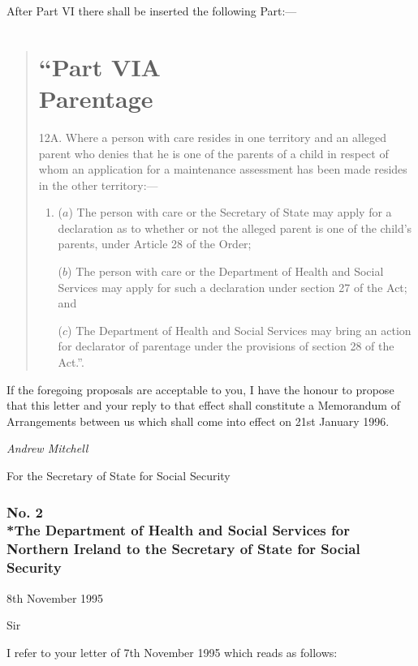 \documentclass[a4paper]{article}
\begin{document}
  After Part VI there shall be inserted the following Part:—
\begin{quotation}
 \part*{“Part VIA\\Parentage}

12A.  Where a person with care resides in one territory and an alleged parent who denies that he is one of the parents of a child in respect of whom an application for a maintenance assessment has been made resides in the other territory:—
\begin{enumerate}\item[]
($a$) The person with care or the Secretary of State may apply for a declaration as to whether or not the alleged parent is one of the child’s parents, under Article 28 of the Order;

($b$) The person with care or the Department of Health and Social Services may apply for such a declaration under section 27 of the Act; and

($c$) The Department of Health and Social Services may bring an action for declarator of parentage under the provisions of section 28 of the Act.”.
\end{enumerate}
\end{quotation}

  If the foregoing proposals are acceptable to you, I have the honour to propose that this letter and your reply to that effect shall constitute a Memorandum of Arrangements between us which shall come into effect on 21st January 1996.

  \emph{Andrew Mitchell}

  For the Secretary of State for Social Security

\section*{\sloppy No. 2\\*The Department of Health and Social Services for Northern Ireland to the Secretary of State for Social Security}

8th November 1995

  Sir

  I refer to your letter of 7th November 1995 which reads as follows:
\end{document}
